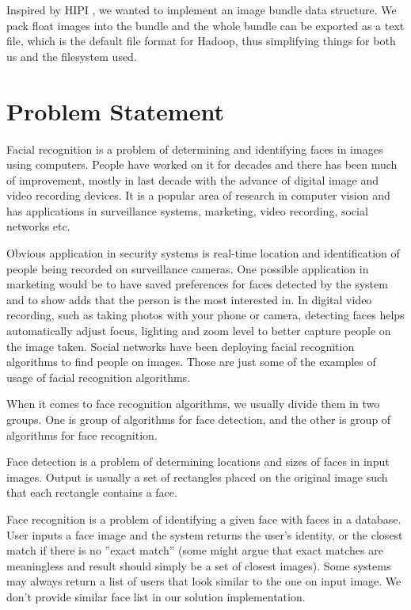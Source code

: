 \documentclass[11pt, draftclsnofoot, onecolumn]{IEEEtran}
\begin{document}
Inspired by HIPI \cite{sweeney2011hipi}, we wanted to implement an image bundle data structure. We pack float images into the bundle and the whole bundle can be exported as a text file, which is the default file format for Hadoop, thus simplifying things for both us and the filesystem used.

\section{Problem Statement} \label{sec:problem}

Facial recognition is a problem of determining and identifying faces in images using computers. People have worked on it for decades and there has been much of improvement, mostly in last decade with the advance of digital image and video recording devices. It is a popular area of research in computer vision and has applications in surveillance systems, marketing, video recording, social networks etc.

Obvious application in security systems is real-time location and identification of people being recorded on surveillance cameras. One possible application in marketing would be to have saved preferences for faces detected by the system and to show adds that the person is the most interested in. In digital video recording, such as taking photos with your phone or camera, detecting faces helps automatically adjust focus, lighting and zoom level to better capture people on the image taken. Social networks have been deploying facial recognition algorithms to find people on images. Those are just some of the examples of usage of facial recognition algorithms.

When it comes to face recognition algorithms, we usually divide them in two groups. One is group of algorithms for face detection, and the other is group of algorithms for face recognition.

Face detection is a problem of determining locations and sizes of faces in input images. Output is usually a set of rectangles placed on the original image such that each rectangle contains a face.

Face recognition is a problem of identifying a given face with faces in a database. User inputs a face image and the system returns the user's identity, or the closest match if there is no ''exact match'' (some might argue that exact matches are meaningless and result should simply be a set of closest images). Some systems may always return a list of users that look similar to the one on input image. We don't provide similar face list in our solution implementation.
\end{document}

